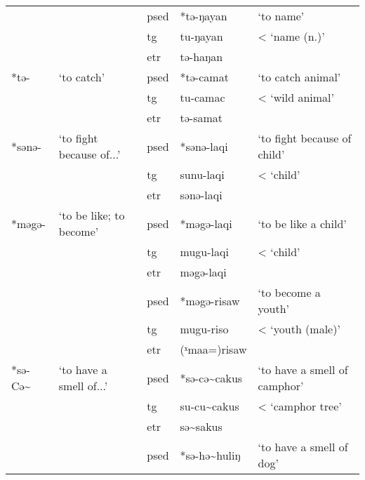 \begin{table}[!htbp]
\begin{tabular}{lllll}
     &                    & \ac{psed} & *tə-ŋayan        & `to name'                  \\
     &                    & \ac{tg}   & tu-ŋayan         & \quad < `name (n.)'                           \\
     &                    & \ac{etr}  & tə-haŋan         &                            \\ \hline
*tə- & `to catch'         & \ac{psed} & *tə-camat        & `to catch animal'          \\
     &                    & \ac{tg}   & tu-camac         & \quad < `wild animal'                           \\
     &                    & \ac{etr}  & tə-samat         &                            \\ \hline
*sənə-     & `to fight because of...'  & \ac{psed} & *sənə-laqi      & `to fight because of child'    \\
     &                    & \ac{tg}   & sunu-laqi        & \quad < `child'                           \\
     &                    & \ac{etr}  & sənə-laqi        &                            \\ \hline
*məgə-     & `to be like; to become'   & \ac{psed} & *məgə-laqi      & `to be like a child'           \\
     &                    & \ac{tg}   & mugu-laqi        & \quad < `child'                           \\
     &                    & \ac{etr}  & məgə-laqi        &                            \\ \cline{3-5} 
     &                    & \ac{psed} & *məgə-risaw      & `to become a youth'        \\
     &                    & \ac{tg}   & mugu-riso        & \quad < `youth (male)'                           \\
     &                    & \ac{etr}  & (ˣmaa=)risaw     &                            \\ \hline
*sə-Cə\~{} & `to have a smell of...'   & \ac{psed} & *sə-cə\~{}cakus & `to have a smell of camphor' \\
     &                    & \ac{tg}   & su-cu\~{}cakus   & \quad < `camphor tree'                           \\
     &                    & \ac{etr}  & sə\~{}sakus      &                            \\ \cline{3-5} 
     &                    & \ac{psed} & *sə-hə\~{}huliŋ  & `to have a smell of dog' \\

\end{tabular}
\end{table}
